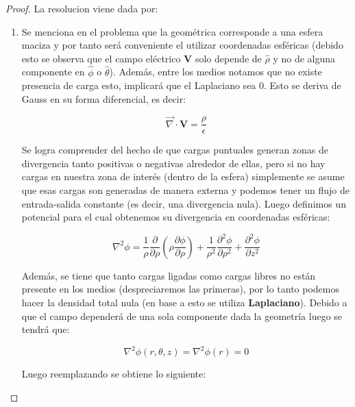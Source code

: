 \begin{proof} %
    La resolucion viene dada por:
    \begin{enumerate}
        \item Se menciona en el problema que la geométrica corresponde a una esfera maciza y por tanto será conveniente el utilizar coordenadas esféricas (debido esto se observa que el campo eléctrico \textbf{V} solo depende de $\hat{\rho}$ y no de alguna componente en $\hat{\phi}$ o $\hat{\theta}$). Además, entre los medios notamos que no existe presencia de carga esto, implicará que el Laplaciano sea 0. Esto se deriva de Gauss en su forma  diferencial, es decir:

        \begin{equation}
            \Vec{\nabla} \cdot \textbf{V} = \frac{\rho}{\epsilon} 
        \end{equation}
        
        Se logra comprender del hecho de que cargas puntuales generan zonas de divergencia tanto positivas o negativas alrededor de ellas, pero si no hay cargas en nuestra zona de interés (dentro de la esfera) simplemente se asume que esas cargas son generadas de manera externa y podemos tener un flujo de entrada-salida constante (es decir, una divergencia nula). Luego definimos un potencial para el cual obtenemos su divergencia en coordenadas esféricas:
        
        \begin{equation}
            \nabla^{2}\phi = \frac{1}{\rho} \frac{\partial}{\partial\rho}\left(\rho \frac{\partial\phi}{\partial \rho}\right) + \frac{1}{\rho^{2}}\frac{\partial^{2}\phi}{\partial\rho^{2}} + \frac{\partial^{2}\phi}{\partial z^{2}}
        \end{equation}
        
        Además, se tiene que tanto cargas ligadas como cargas libres no están presente en los medios (despreciaremos las primeras), por lo tanto podemos hacer la densidad total nula (en base a esto se utiliza \textbf{Laplaciano}). Debido a que el campo dependerá de una sola componente dada la geometría luego se tendrá que:
        
        \begin{equation}
            \nabla^{2}\phi(r,\theta, z) =  \nabla^{2}\phi(r)=0
        \end{equation}
        
        Luego reemplazando se obtiene lo siguiente:
        

\end{enumerate}
\end{proof}
